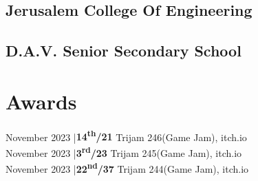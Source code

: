 \documentclass[]{deedy-resume-openfont}
\begin{document}
\begin{minipage}[t]{0.28\textwidth}
\subsection{Jerusalem College Of Engineering}
\sectionsep

\subsection{D.A.V. Senior Secondary School}
\sectionsep


\section{Awards}
November 2023 |{\bf 14\textsuperscript{th}/21} Trijam 246(Game Jam), itch.io\\
November 2023 |{\bf 3\textsuperscript{rd}/23}  Trijam 245(Game Jam), itch.io\\
November 2023 |{\bf 22\textsuperscript{nd}/37} Trijam 244(Game Jam), itch.io\\
\sectionsep

%
%

\end{minipage} 
\hfill
\end{document}
